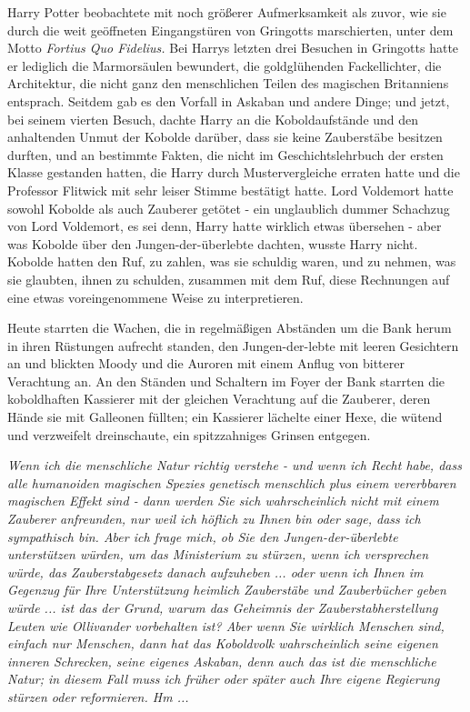 Harry Potter beobachtete mit noch größerer Aufmerksamkeit als zuvor, wie sie
durch die weit geöffneten Eingangstüren von Gringotts marschierten, unter dem
Motto \emph{Fortius Quo Fidelius.} Bei Harrys letzten drei Besuchen in Gringotts
hatte er lediglich die Marmorsäulen bewundert, die goldglühenden Fackellichter,
die Architektur, die nicht ganz den menschlichen Teilen des magischen
Britanniens entsprach. Seitdem gab es den Vorfall in Askaban und andere Dinge;
und jetzt, bei seinem vierten Besuch, dachte Harry an die Koboldaufstände und
den anhaltenden Unmut der Kobolde darüber, dass sie keine Zauberstäbe besitzen
durften, und an bestimmte Fakten, die nicht im Geschichtslehrbuch der ersten
Klasse gestanden hatten, die Harry durch Mustervergleiche erraten hatte und die
Professor Flitwick mit sehr leiser Stimme bestätigt hatte. Lord Voldemort hatte
sowohl Kobolde als auch Zauberer getötet - ein unglaublich dummer Schachzug von
Lord Voldemort, es sei denn, Harry hatte wirklich etwas übersehen - aber was
Kobolde über den Jungen-der-überlebte dachten, wusste Harry nicht. Kobolde
hatten den Ruf, zu zahlen, was sie schuldig waren, und zu nehmen, was sie
glaubten, ihnen zu schulden, zusammen mit dem Ruf, diese Rechnungen auf eine
etwas voreingenommene Weise zu interpretieren.

Heute starrten die Wachen, die in regelmäßigen Abständen um die Bank herum in
ihren Rüstungen aufrecht standen, den Jungen-der-lebte mit leeren Gesichtern an
und blickten Moody und die Auroren mit einem Anflug von bitterer Verachtung an.
An den Ständen und Schaltern im Foyer der Bank starrten die koboldhaften
Kassierer mit der gleichen Verachtung auf die Zauberer, deren Hände sie mit
Galleonen füllten; ein Kassierer lächelte einer Hexe, die wütend und verzweifelt
dreinschaute, ein spitzzahniges Grinsen entgegen.

\emph{Wenn ich die menschliche Natur richtig verstehe - und wenn ich Recht habe,
dass alle humanoiden magischen Spezies genetisch menschlich plus einem
vererbbaren magischen Effekt sind - dann werden Sie sich wahrscheinlich nicht
mit einem Zauberer anfreunden, nur weil ich höflich zu Ihnen bin oder sage, dass
ich sympathisch bin. Aber ich frage mich, ob Sie den Jungen-der-überlebte
unterstützen würden, um das Ministerium zu stürzen, wenn ich versprechen würde,
das Zauberstabgesetz danach aufzuheben ... oder wenn ich Ihnen im Gegenzug für
Ihre Unterstützung heimlich Zauberstäbe und Zauberbücher geben würde ... ist das
der Grund, warum das Geheimnis der Zauberstabherstellung Leuten wie Ollivander
vorbehalten ist? Aber wenn Sie wirklich Menschen sind, einfach nur Menschen,
dann hat das Koboldvolk wahrscheinlich seine eigenen inneren Schrecken, seine
eigenes Askaban, denn auch das ist die menschliche Natur; in diesem Fall muss
ich früher oder später auch Ihre eigene Regierung stürzen oder reformieren.
Hm ...}

